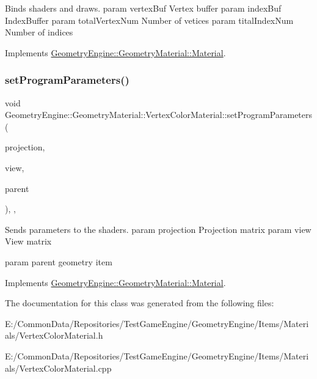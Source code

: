 Binds shaders and draws. param vertex\+Buf Vertex buffer param index\+Buf Index\+Buffer param total\+Vertex\+Num Number of vetices param tital\+Index\+Num Number of indices 

Implements \mbox{\hyperlink{class_geometry_engine_1_1_geometry_material_1_1_material_a0070eab6e5fe86dc05dc69f2e37b9072}{Geometry\+Engine\+::\+Geometry\+Material\+::\+Material}}.

\mbox{\label{class_geometry_engine_1_1_geometry_material_1_1_vertex_color_material_a11bf01fb1d5ef41fb1a9cf4080c98b8c}} 
\subsubsection{\texorpdfstring{setProgramParameters()}{setProgramParameters()}}
{\footnotesize\ttfamily void Geometry\+Engine\+::\+Geometry\+Material\+::\+Vertex\+Color\+Material\+::set\+Program\+Parameters (\begin{DoxyParamCaption}\item[{const Q\+Matrix4x4 \&}]{projection,  }\item[{const Q\+Matrix4x4 \&}]{view,  }\item[{const \mbox{\hyperlink{class_geometry_engine_1_1_geometry_world_item_1_1_geometry_item_1_1_geometry_item}{Geometry\+World\+Item\+::\+Geometry\+Item\+::\+Geometry\+Item}} \&}]{parent }\end{DoxyParamCaption})\hspace{0.3cm}{\ttfamily [override]}, {\ttfamily [protected]}, {\ttfamily [virtual]}}

Sends parameters to the shaders. param projection Projection matrix param view View matrix

param parent geometry item 

Implements \mbox{\hyperlink{class_geometry_engine_1_1_geometry_material_1_1_material_a68310797df53062f237d0005fbcfce7e}{Geometry\+Engine\+::\+Geometry\+Material\+::\+Material}}.



The documentation for this class was generated from the following files\+:\begin{DoxyCompactItemize}
\item 
E\+:/\+Common\+Data/\+Repositories/\+Test\+Game\+Engine/\+Geometry\+Engine/\+Items/\+Materials/Vertex\+Color\+Material.\+h\item 
E\+:/\+Common\+Data/\+Repositories/\+Test\+Game\+Engine/\+Geometry\+Engine/\+Items/\+Materials/Vertex\+Color\+Material.\+cpp\end{DoxyCompactItemize}

